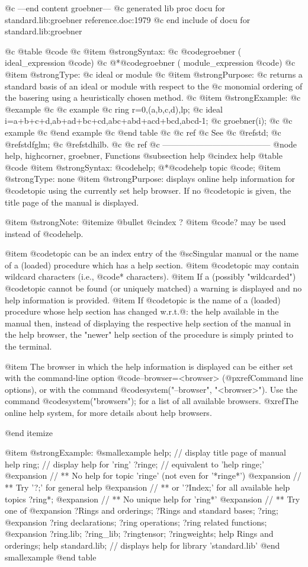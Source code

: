 {@c ---end content groebner---
@c generated lib proc docu for standard.lib:groebner reference.doc:1979 
@c end include of docu for standard.lib:groebner

@c @table @code
@c @item @strong{Syntax:}
@c @code{groebner (} ideal_expression @code{)}
@c @*@code{groebner (} module_expression @code{)}
@c @item @strong{Type:}
@c ideal or module
@c @item @strong{Purpose:}
@c returns a standard basis of an ideal or module with respect to the
@c monomial ordering of the basering using a heuristically chosen method.
@c @item @strong{Example:}
@c @example
@c @c example
@c   ring r=0,(a,b,c,d),lp;
@c   ideal i=a+b+c+d,ab+ad+bc+cd,abc+abd+acd+bcd,abcd-1;
@c   groebner(i);
@c @c example
@c @end example
@c @end table
@c @c ref
@c See
@c @ref{std};
@c @ref{stdfglm};
@c @ref{stdhilb}.
@c @c ref
@c ---------------------------------------
@node help, highcorner, groebner, Functions
@subsection help
@cindex help
@table @code
@item @strong{Syntax:}
@code{help;}
@*@code{help} topic @code{;}
@item @strong{Type:}
none
@item @strong{Purpose:}
displays online help information for @code{topic} using the currently
set help browser. If no @code{topic} is given, the title page of the
manual is displayed.

@item @strong{Note:}
@itemize @bullet
@cindex ?
@item
@code{?} may be used instead of @code{help}.

@item
@code{topic} can be an index entry of the @sc{Singular} manual or the
name of a (loaded) procedure which has a help section.
@item
@code{topic} may contain wildcard characters (i.e.,
@code{*} characters).
@item
If a (possibly "wildcarded") @code{topic} cannot be found (or
uniquely matched) a warning is displayed and no help information is
provided.
@item
If @code{topic} is the name of a (loaded) procedure whose help
section has changed w.r.t.@: the help available in the manual then,
instead of displaying the respective help section of the manual in the
help browser, the "newer" help section of the procedure is simply
printed to the terminal.

@item
The browser in which the help information is displayed can be either set
with the command-line option @code{--browser=<browser>} (@pxref{Command
line options}), or with the command @code{system("--browser",
"<browser>")}. Use the command @code{system("browsers");} for a list of
all available browsers. @xref{The online help system}, for more details
about help browsers.

@end itemize

@item @strong{Example:}
@smallexample
help;      // display title page of manual
help ring; // display help for 'ring'
?ringe;    // equivalent to 'help ringe;'
@expansion{} // ** No help for topic 'ringe' (not even for '*ringe*')
@expansion{} // ** Try '?;'       for general help
@expansion{} // ** or  '?Index;'  for all available help topics
?ring*;
@expansion{} //  ** No unique help for 'ring*'
@expansion{} //  ** Try one of
@expansion{} ?Rings and orderings; ?Rings and standard bases; ?ring;
@expansion{} ?ring declarations; ?ring operations; ?ring related functions;
@expansion{} ?ring.lib; ?ring_lib; ?ringtensor; ?ringweights;
help Rings and orderings;
help standard.lib;  // displays help for library 'standard.lib'
@end smallexample
@end table

}
